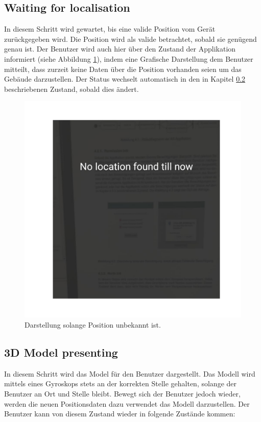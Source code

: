 \documentclass[a4paper]{scrreprt}
\begin{document}
\subsection{Waiting for localisation} \label{ch:waitingForLocation}
In diesem Schritt wird gewartet, bis eine valide Position vom Gerät zurückgegeben wird. Die Position wird als valide betrachtet, sobald sie genügend genau ist. Der Benutzer wird auch hier über den Zustand der Applikation informiert (siehe Abbildung \ref{fig:KoordinationNotFound}), indem eine Grafische Darstellung dem Benutzer mitteilt, dass zurzeit keine Daten über die Position vorhanden seien um das Gebäude darzustellen. Der Status wechselt automatisch in den in Kapitel \ref{ch:ThreeDModelPresenting} beschriebenen Zustand, sobald dies ändert.

\begin{figure}[h!]
	\includegraphics[keepaspectratio, width=\textwidth]{UnknownLocation.png}
	\caption{Darstellung solange Position unbekannt ist.}
    \label{fig:KoordinationNotFound}
\end{figure}


\subsection{3D Model presenting} \label{ch:ThreeDModelPresenting}
In diesem Schritt wird das Model für den Benutzer dargestellt. Das Modell wird mittels eines Gyroskops stets an der korrekten Stelle gehalten, solange der Benutzer an Ort und Stelle bleibt. Bewegt sich der Benutzer jedoch wieder, werden die neuen Positionsdaten dazu verwendet das Modell darzustellen.
Der Benutzer kann von diesem Zustand wieder in folgende Zustände kommen:
\end{document}
